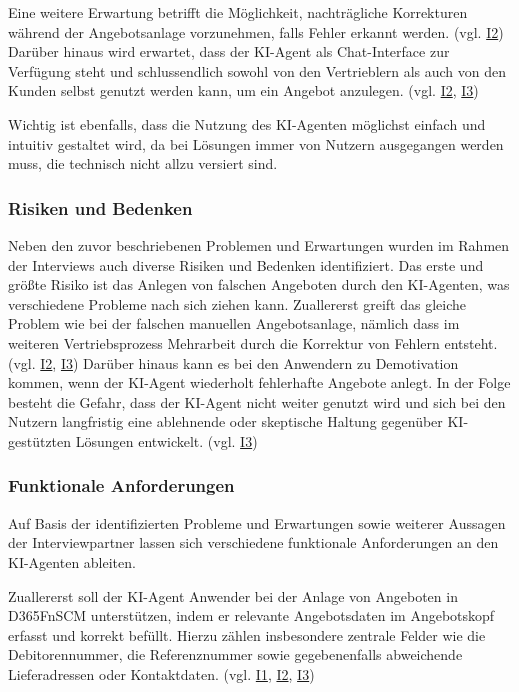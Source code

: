 Eine weitere Erwartung betrifft die Möglichkeit, nachträgliche Korrekturen während der Angebotsanlage vorzunehmen, falls Fehler erkannt werden. (vgl. \hyperref[anhang:i2]{I2}) Darüber hinaus wird erwartet, dass der \ac{KI}-Agent als Chat-Interface zur Verfügung steht und schlussendlich sowohl von den Vertrieblern als auch von den Kunden selbst genutzt werden kann, um ein Angebot anzulegen. (vgl. \hyperref[anhang:i2]{I2}, \hyperref[anhang:i3]{I3})

Wichtig ist ebenfalls, dass die Nutzung des \ac{KI}-Agenten möglichst einfach und intuitiv gestaltet wird, da bei Lösungen immer von Nutzern ausgegangen werden muss, die technisch nicht allzu versiert sind. 

\subsubsection{Risiken und Bedenken}
Neben den zuvor beschriebenen Problemen und Erwartungen wurden im Rahmen der Interviews auch diverse Risiken und Bedenken identifiziert.
Das erste und größte Risiko ist das Anlegen von falschen Angeboten durch den \ac{KI}-Agenten, was verschiedene Probleme nach sich ziehen kann. Zuallererst greift das gleiche Problem wie bei der falschen manuellen Angebotsanlage, nämlich dass im weiteren Vertriebsprozess Mehrarbeit durch die Korrektur von Fehlern entsteht. (vgl. \hyperref[anhang:i2]{I2}, \hyperref[anhang:i3]{I3}) Darüber hinaus kann es bei den Anwendern zu Demotivation kommen, wenn der \ac{KI}-Agent wiederholt fehlerhafte Angebote anlegt. In der Folge besteht die Gefahr, dass der \ac{KI}-Agent nicht weiter genutzt wird und sich bei den Nutzern langfristig eine ablehnende oder skeptische Haltung gegenüber \ac{KI}-gestützten Lösungen entwickelt. (vgl. \hyperref[anhang:i3]{I3})

\subsubsection{Funktionale Anforderungen}
Auf Basis der identifizierten Probleme und Erwartungen sowie weiterer Aussagen der Interviewpartner lassen sich verschiedene funktionale Anforderungen an den \ac{KI}-Agenten ableiten. 

Zuallererst soll der \ac{KI}-Agent Anwender bei der Anlage von Angeboten in \ac{D365FnSCM} unterstützen, indem er relevante Angebotsdaten im Angebotskopf erfasst und korrekt befüllt. Hierzu zählen insbesondere zentrale Felder wie die Debitorennummer, die Referenznummer sowie gegebenenfalls abweichende Lieferadressen oder Kontaktdaten. (vgl. \hyperref[anhang:i1]{I1}, \hyperref[anhang:i2]{I2}, \hyperref[anhang:i3]{I3})

